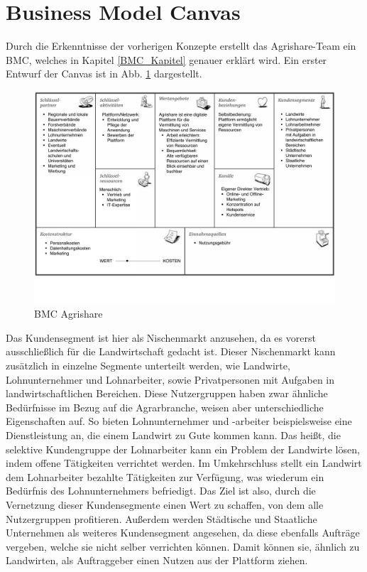 \section{Business Model Canvas}
Durch die Erkenntnisse der vorherigen Konzepte erstellt das Agrishare-Team ein \ac{BMC}, welches in Kapitel \ref{BMC_Kapitel} genauer erklärt wird. Ein erster Entwurf der Canvas ist in Abb. \ref{BMC_Agrishare} dargestellt.
\begin{figure}[h!]
		\includegraphics[angle=90,origin=c,width=\textwidth]{99_PDF_INCLUDE/BMC_draft.pdf}
		\caption{\ac{BMC} Agrishare}
		\label{BMC_Agrishare}
\end{figure}

Das Kundensegment ist hier als Nischenmarkt anzusehen, da es vorerst ausschließlich für die Landwirtschaft gedacht ist. Dieser Nischenmarkt kann zusätzlich in einzelne Segmente unterteilt werden, wie Landwirte, Lohnunternehmer und Lohnarbeiter, sowie Privatpersonen mit Aufgaben in landwirtschaftlichen Bereichen. Diese Nutzergruppen haben zwar ähnliche Bedürfnisse im Bezug auf die Agrarbranche, weisen aber unterschiedliche Eigenschaften auf. So bieten Lohnunternehmer und -arbeiter beispielsweise eine Dienstleistung an, die einem Landwirt zu Gute kommen kann. Das heißt, die selektive Kundengruppe der Lohnarbeiter kann ein Problem der Landwirte lösen, indem offene Tätigkeiten verrichtet werden. Im Umkehrschluss stellt ein Landwirt dem Lohnarbeiter bezahlte Tätigkeiten zur Verfügung, was wiederum ein Bedürfnis des Lohnunternehmers befriedigt. Das Ziel ist also, durch die Vernetzung dieser Kundensegmente einen Wert zu schaffen, von dem alle Nutzergruppen profitieren. Außerdem werden Städtische und Staatliche Unternehmen als weiteres Kundensegment angesehen, da diese ebenfalls Aufträge vergeben, welche sie nicht selber verrichten können. Damit können sie, ähnlich zu Landwirten, als Auftraggeber einen Nutzen aus der Plattform ziehen.


